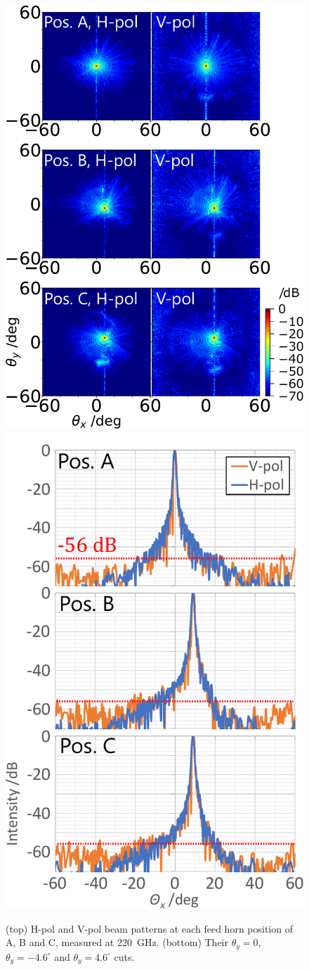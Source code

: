 \documentclass[journal]{IEEEtran}
\begin{document}
%
\begin{figure}[!t]
\centering
\includegraphics[width=0.9\linewidth]{Figures/HVpol_220G.pdf}
\hfil
\includegraphics[width=0.7\linewidth]{Figures/HVpol_220G_Xcut}
\caption{%
(top) H-pol and V-pol beam patterns at each feed horn position of A, B and C, measured at 220~GHz. 
(bottom) Their $\theta_y = 0$, $\theta_y = -4.6^\circ$ and $\theta_y = 4.6^\circ$ cuts.
}
\label{fig:HVpol_220G}
\end{figure}
%
\end{document}
